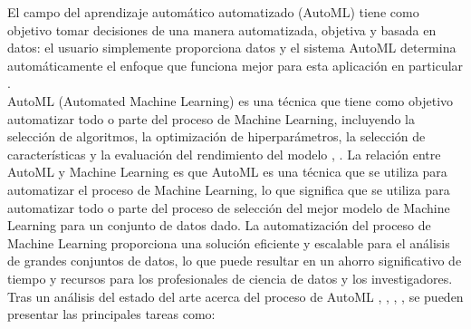 El campo del aprendizaje automático automatizado (AutoML) tiene como objetivo tomar decisiones de una manera automatizada, objetiva y basada en datos: el usuario simplemente proporciona datos y el sistema AutoML determina automáticamente el enfoque que funciona mejor para esta aplicación en particular \citep{hutter2019automated}. \\
AutoML (Automated Machine Learning) es una técnica que tiene como objetivo automatizar todo o parte del proceso de Machine Learning, incluyendo la selección de algoritmos, la optimización de hiperparámetros, la selección de características y la evaluación del rendimiento del modelo \citep{he2021automl}, \citep{tuggener2019automated}. La relación entre AutoML y Machine Learning es que AutoML es una técnica que se utiliza para automatizar el proceso de Machine Learning, lo que significa que se utiliza para automatizar todo o parte del proceso de selección del mejor modelo de Machine Learning para un conjunto de datos dado. La automatización del proceso de Machine Learning proporciona una solución eficiente y escalable para el análisis de grandes conjuntos de datos, lo que puede resultar en un ahorro significativo de tiempo y recursos para los profesionales de ciencia de datos y los investigadores. \\ 
Tras un análisis del estado del arte acerca del proceso de AutoML \citep{tuggener2019automated}, \citep{waring2020automated}, \citep{hutter2019automated}, \citep{he2021automl}, se pueden presentar las principales tareas como:
